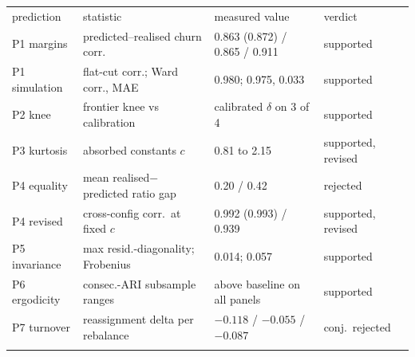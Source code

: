 \documentclass{rQUF2e}
\theoremstyle{plain}
\theoremstyle{remark}
\begin{document}
\begin{table}
\begin{center}
{\begin{tabular}{llll}
\toprule
prediction & statistic & measured value & verdict \\
\colrule
P1 margins & predicted--realised churn corr.
 & 0.863 (0.872) / 0.865 / 0.911 & supported \\
P1 simulation & flat-cut corr.; Ward corr., MAE
 & 0.980; 0.975, 0.033 & supported \\
P2 knee & frontier knee vs calibration
 & calibrated $\delta$ on 3 of 4 & supported \\
P3 kurtosis & absorbed constants $c$
 & 0.81 to 2.15 & supported, revised \\
P4 equality & mean realised$-$predicted ratio gap
 & 0.20 / 0.42 & rejected \\
P4 revised & cross-config corr.\ at fixed $c$
 & 0.992 (0.993) / 0.939 & supported, revised \\
P5 invariance & max resid.-diagonality; Frobenius
 & 0.014; 0.057 & supported \\
P6 ergodicity & consec.-ARI subsample ranges
 & above baseline on all panels & supported \\
P7 turnover & reassignment delta per rebalance
 & $-0.118$ / $-0.055$ / $-0.087$ & conj.\ rejected \\
\botrule
\end{tabular}}
\label{tab:scorecard}
\end{center}
\end{table}
\end{document}
